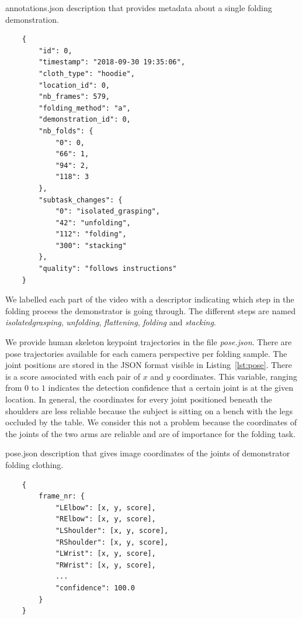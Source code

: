 \documentclass[\home/main.tex]{subfiles}
\begin{document}
\begin{listing}[htb]
    \caption{annotations.json description that provides metadata about a single folding demonstration.}
    \label{lst:annotations}
    \begin{verbatim}
    {
        "id": 0,
        "timestamp": "2018-09-30 19:35:06",
        "cloth_type": "hoodie",
        "location_id": 0,
        "nb_frames": 579,
        "folding_method": "a",
        "demonstration_id": 0,
        "nb_folds": {
            "0": 0,
            "66": 1,
            "94": 2,
            "118": 3
        },
        "subtask_changes": {
            "0": "isolated_grasping",
            "42": "unfolding",
            "112": "folding",
            "300": "stacking"
        },
        "quality": "follows instructions"
    }
    \end{verbatim}
\end{listing}



We labelled each part of the video with a descriptor indicating which step in the folding process the demonstrator is going through. The different steps are named \textit{isolated\textunderscore grasping}, \textit{unfolding}, \textit{flattening}, \textit{folding} and \textit{stacking}.

We provide human skeleton keypoint trajectories in the file \textit{pose.json}. There are pose trajectories available for each camera perspective per folding sample. The joint positions are stored in the JSON format visible in Listing~\ref{lst:pose}. There is a score associated with each pair of $x$ and $y$ coordinates. This variable, ranging from $0$ to $1$ indicates the detection confidence that a certain joint is at the given location. In general, the coordinates for every joint positioned beneath the shoulders are less reliable because the subject is sitting on a bench with the legs occluded by the table. We consider this not a problem because the coordinates of the joints of the two arms are reliable and are of importance for the folding task.


\begin{listing}[htb]
    \caption{pose.json description that gives image coordinates of the joints of demonstrator folding clothing.}
    \label{lst:pose}
    \begin{verbatim}
    {
        frame_nr: {
            "LElbow": [x, y, score],
            "RElbow": [x, y, score],
            "LShoulder": [x, y, score],
            "RShoulder": [x, y, score],
            "LWrist": [x, y, score],
            "RWrist": [x, y, score],
            ... 
            "confidence": 100.0
        }
    }
    \end{verbatim}
\end{listing}
\end{document}
